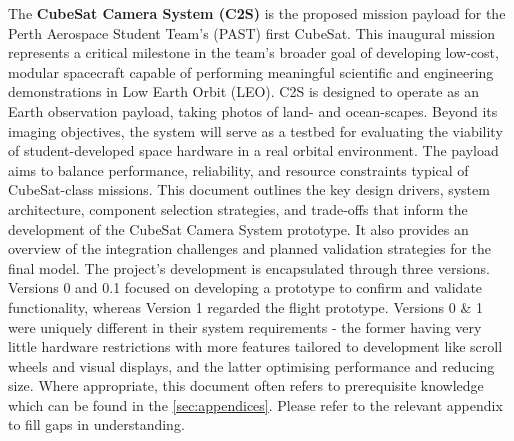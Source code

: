The \textbf{CubeSat Camera System (C2S)} is the proposed mission payload for the Perth Aerospace Student Team's (PAST) first CubeSat. This inaugural mission represents a critical milestone in the team's broader goal of developing low-cost, modular spacecraft capable of performing meaningful scientific and engineering demonstrations in Low Earth Orbit (LEO). C2S is designed to operate as an Earth observation payload, taking photos of land- and ocean-scapes. Beyond its imaging objectives, the system will serve as a testbed for evaluating the viability of student-developed space hardware in a real orbital environment. The payload aims to balance performance, reliability, and resource constraints typical of CubeSat-class missions.
\nl
This document outlines the key design drivers, system architecture, component selection strategies, and trade-offs that inform the development of the CubeSat Camera System prototype. It also provides an overview of the integration challenges and planned validation strategies for the final model.
\nl
The project's development is encapsulated through three versions. Versions 0 and 0.1 focused on developing a prototype to confirm and validate functionality, whereas Version 1 regarded the flight prototype. Versions 0 \& 1 were uniquely different in their system requirements - the former having very little hardware restrictions with more features tailored to development like scroll wheels and visual displays, and the latter optimising performance and reducing size. 
\nl
Where appropriate, this document often refers to prerequisite knowledge which can be found in the \autoref{sec:appendices}. Please refer to the relevant appendix to fill gaps in understanding.